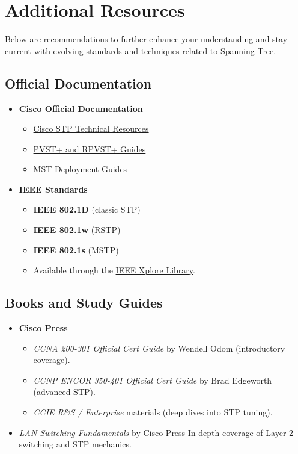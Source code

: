 \documentclass[a4paper]{report}
\begin{document}
\chapter{Additional Resources}

Below are recommendations to further enhance your understanding and stay current with evolving standards and techniques related to Spanning Tree.

\section{Official Documentation}
\begin{itemize}
    \item \textbf{Cisco Official Documentation}
    \begin{itemize}
        \item \href{https://www.cisco.com/c/en/us/tech/lan-switching/spanning-tree-protocol/index.html}{Cisco STP Technical Resources}
        \item \href{https://www.cisco.com/c/en/us/td/docs/switches/lan}{PVST+ and RPVST+ Guides}
        \item \href{https://www.cisco.com/c/en/us/support/docs/lan-switching/spanning-tree-protocol}{MST Deployment Guides}
    \end{itemize}
    \item \textbf{IEEE Standards}
    \begin{itemize}
        \item \textbf{IEEE 802.1D} (classic STP)
        \item \textbf{IEEE 802.1w} (RSTP)
        \item \textbf{IEEE 802.1s} (MSTP)
        \item Available through the \href{https://ieeexplore.ieee.org/}{IEEE Xplore Library}.
    \end{itemize}
\end{itemize}

\section{Books and Study Guides}
\begin{itemize}
    \item \textbf{Cisco Press}
    \begin{itemize}
        \item \textit{CCNA 200-301 Official Cert Guide} by Wendell Odom (introductory coverage).
        \item \textit{CCNP ENCOR 350-401 Official Cert Guide} by Brad Edgeworth (advanced STP).
        \item \textit{CCIE R\&S / Enterprise} materials (deep dives into STP tuning).
    \end{itemize}
    \item \textit{LAN Switching Fundamentals} by Cisco Press \textendash{} In-depth coverage of Layer 2 switching and STP mechanics.
\end{itemize}
\end{document}
